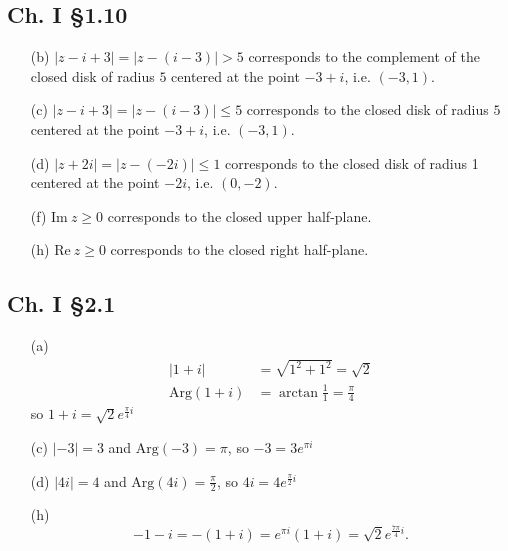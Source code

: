 \documentclass{article}
\begin{document}
\subsection*{Ch. I \S 1.10}
\begin{itemize}
  \item[(b)]
  {
    $|z - i + 3| = |z - (i - 3)| > 5$ corresponds to the complement of
    the closed disk of radius $5$ centered at the point $-3 + i$,
    i.e. $(-3, 1)$.
  }
  \item[(c)]
  {
    $|z - i + 3| = |z - (i - 3)| \leq 5$ corresponds to the closed
    disk of radius $5$ centered at the point $-3 + i$, i.e. $(-3, 1)$.
  }
  \item[(d)]
  {
    $|z + 2i| = |z - (-2i)| \leq 1$ corresponds to the closed disk of
    radius 1 centered at the point $-2i$, i.e. $(0, -2)$.
  }
  \item[(f)]
  {
    $\mathrm{Im}~z \geq 0$ corresponds to the closed upper half-plane.
  }
  \item[(h)]
  {
    $\mathrm{Re}~z \geq 0$ corresponds to the closed right half-plane.
  }
\end{itemize}

\subsection*{Ch. I \S 2.1}
\begin{itemize}
  \item[(a)]{
    \begin{align*}
      |1 + i| &= \sqrt{1^2 + 1^2} = \sqrt{2} \\
      \mathrm{Arg}(1 + i) &= \arctan \frac{1}{1} = \frac{\pi}{4}
    \end{align*}
    so $1 + i = \sqrt{2}e^{\frac{\pi}{4} i}$
  }
  \item[(c)]{
    $|-3| = 3$ and $\mathrm{Arg}(-3) = \pi$, so
    $-3 = 3e^{\pi i}$
  }
  \item[(d)]{
    $|4i| = 4$ and $\mathrm{Arg}(4i) = \frac{\pi}{2}$, so
    $4i = 4e^{\frac{\pi}{2} i}$
  }
  \item[(h)]{
    $$
      -1 - i
    = -(1+i)
    = e^{\pi i} (1 + i)
    = \sqrt{2}e^{\frac{7\pi}{4} i}.
    $$
  }
\end{itemize}
\end{document}
